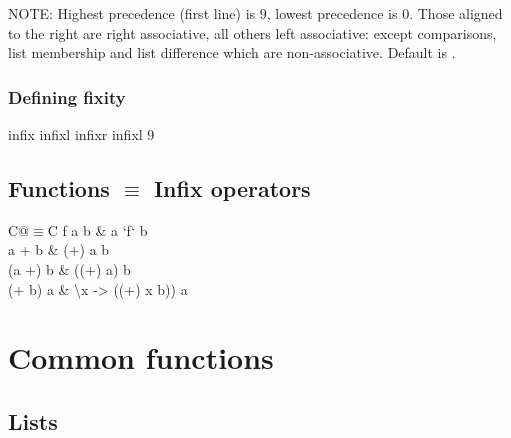 \documentclass{refcard}
\newcommand{\la}{\textbackslash}
\begin{document}
\noindent
NOTE: Highest precedence (first line) is 9, lowest precedence is 0.  Those
aligned to the right are right associative, all others left associative: except
comparisons, list membership and list difference which are non-associative.  Default is
.

\subsubsection{Defining fixity}
\begin{ldesc}
	 infix  
	 infixl  \I{+--+}
	 infixr  \I{-!-}
	 infixl 9
\end{ldesc}

\subsection{Functions $\equiv$ Infix operators}

\begin{tabular}{C@{\s$\equiv$\s}C}
	f a b & a `f` b \\
	a + b & (+) a b \\
	(a +) b & ((+) a) b \\
	(+ b) a & \la{}x -> ((+) x b)) a \\
\end{tabular}


\section{Common functions}

\subsection{Lists}
\end{document}

